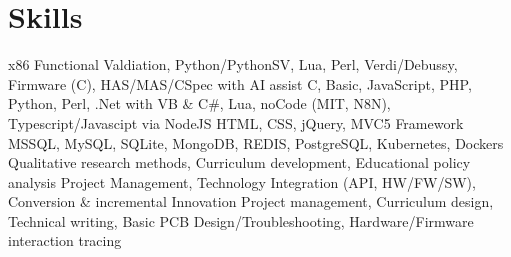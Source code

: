 
\section{\textbf{Skills}}
\vspace{-0.4mm}
 \resumeHeadingSkillStart
    {x86 Functional Valdiation, Python/PythonSV, Lua, Perl, Verdi/Debussy, Firmware (C), HAS/MAS/CSpec with AI assist }
    {C, Basic, JavaScript, PHP, Python, Perl, .Net with VB \& C\#, Lua, noCode (MIT, N8N), Typescript/Javascipt via NodeJS }
    {HTML, CSS, jQuery, MVC5 Framework}
    {MSSQL, MySQL, SQLite, MongoDB, REDIS, PostgreSQL, }
    {Kubernetes, Dockers}
    {Qualitative research methods, Curriculum development, Educational policy analysis}
    {Project Management, Technology Integration (API, HW/FW/SW), Conversion \& incremental Innovation }
    {Project management, Curriculum design, Technical writing, Basic PCB Design/Troubleshooting, Hardware/Firmware interaction tracing}
 \resumeHeadingSkillEnd
